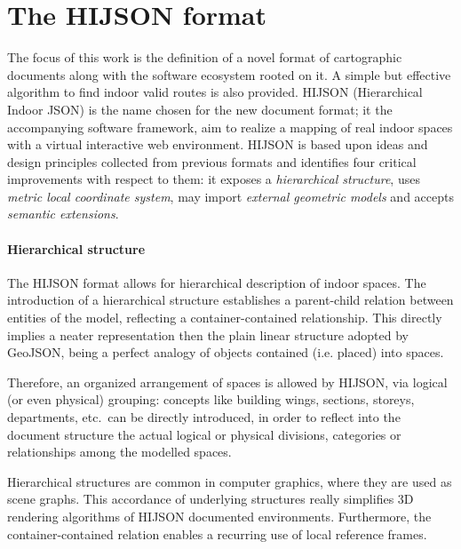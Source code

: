 \section{The HIJSON format}\label{the-hijson-format}

The focus of this work is the definition of a novel format of cartographic
documents along with the software ecosystem rooted on it. A simple but
effective algorithm to find indoor valid routes is also provided. HIJSON
(Hierarchical Indoor JSON) is the name chosen for the new document format; 
it the accompanying software framework, aim to realize a
mapping of real indoor spaces with a virtual interactive web environment.
HIJSON is based upon ideas and design principles collected from previous
formats and identifies four critical improvements with respect to them: it
exposes a \emph{hierarchical structure}, uses \emph{metric local coordinate
system}, may import \emph{external geometric models} and accepts \emph{semantic
extensions}. 



\paragraph*{Hierarchical structure}\label{hierarchical-structure}

The HIJSON format allows for hierarchical description of indoor spaces. The
introduction of a hierarchical structure establishes a parent-child relation
between entities of the model, reflecting a container-contained relationship.
This directly implies a neater representation then the plain linear structure
adopted by GeoJSON, being a perfect analogy of objects contained (i.e.
placed) into spaces.

Therefore, an organized arrangement of spaces is allowed by HIJSON, via
logical (or even physical) grouping: concepts like building wings, sections,
storeys, departments, etc.~can be directly introduced, in order to reflect
into the document structure the actual logical or physical divisions,
categories or relationships among the modelled spaces.

Hierarchical structures are common in computer graphics, where they are used
as scene graphs. This accordance of underlying structures really simplifies 3D
rendering algorithms of HIJSON documented environments. Furthermore, the
container-contained relation enables a recurring use of local reference
frames.

